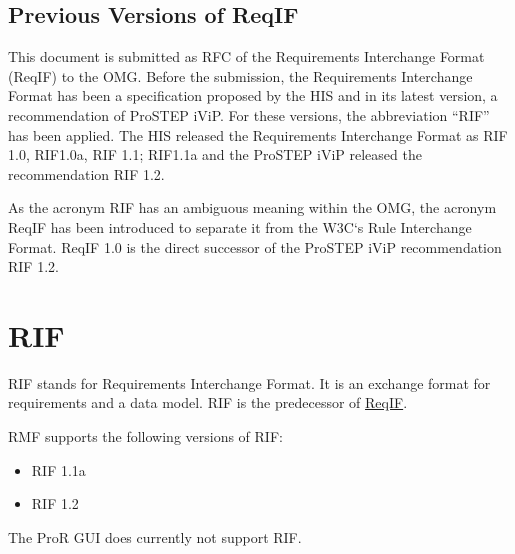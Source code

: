 \subsection{Previous Versions of ReqIF}

This document is submitted as RFC of the Requirements Interchange Format
(ReqIF) to the OMG. Before the submission, the Requirements Interchange
Format has been a specification proposed by the HIS and in its latest
version, a recommendation of ProSTEP iViP. For these versions, the
abbreviation ``RIF'' has been applied. The HIS released the Requirements
Interchange Format as RIF 1.0, RIF1.0a, RIF 1.1; RIF1.1a and the ProSTEP
iViP released the recommendation RIF 1.2.

As the acronym RIF has an ambiguous meaning within the OMG, the acronym
ReqIF has been introduced to separate it from the W3C`s Rule Interchange
Format. ReqIF 1.0 is the direct successor of the ProSTEP iViP
recommendation RIF 1.2.

\section{RIF}

RIF stands for Requirements Interchange Format. It is an exchange format
for requirements and a data model. RIF is the predecessor of
\href{RMF/ReqIF}{ReqIF}.

RMF supports the following versions of RIF:

\begin{itemize}
\item
  RIF 1.1a
\item
  RIF 1.2
\end{itemize}

The ProR GUI does currently not support RIF.

